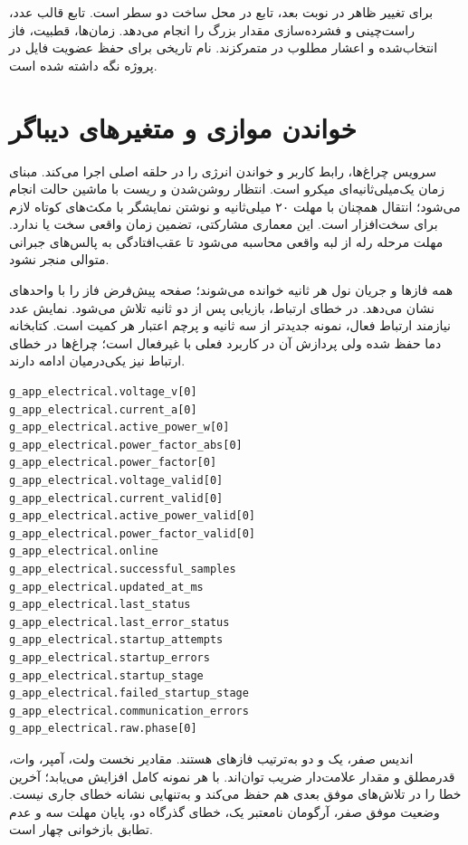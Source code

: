 برای تغییر ظاهر در نوبت بعد، تابع  در
محل ساخت دو سطر است. تابع  قالب عدد، راست‌چینی و فشرده‌سازی مقدار بزرگ را انجام می‌دهد. زمان‌ها، قطبیت، فاز انتخاب‌شده و اعشار مطلوب در
متمرکزند. نام تاریخی  برای حفظ عضویت فایل در پروژه  نگه داشته شده است.

\section{خواندن موازی و متغیرهای دیباگر}
 سرویس چراغ‌ها، رابط کاربر و خواندن انرژی را در حلقه اصلی اجرا می‌کند. مبنای زمان  یک‌میلی‌ثانیه‌ای میکرو است. انتظار روشن‌شدن و ریست  با ماشین حالت انجام می‌شود؛ انتقال  همچنان  با مهلت ۲۰ میلی‌ثانیه و نوشتن نمایشگر با مکث‌های کوتاه لازم برای سخت‌افزار است. این معماری مشارکتی، تضمین زمان واقعی سخت یا  ندارد. مهلت مرحله رله از لبه واقعی محاسبه می‌شود تا عقب‌افتادگی به پالس‌های جبرانی متوالی منجر نشود.

همه فازها و جریان نول هر ثانیه خوانده می‌شوند؛ صفحه پیش‌فرض فاز  را با واحدهای  نشان می‌دهد. در خطای ارتباط، بازیابی پس از دو ثانیه تلاش می‌شود. نمایش عدد نیازمند ارتباط فعال، نمونه جدیدتر از سه ثانیه و پرچم اعتبار هر کمیت است. کتابخانه دما حفظ شده ولی پردازش آن در کاربرد فعلی با  غیرفعال است؛ چراغ‌ها در خطای ارتباط نیز یکی‌درمیان ادامه دارند.

\begin{latin}
\begin{lstlisting}
g_app_electrical.voltage_v[0]
g_app_electrical.current_a[0]
g_app_electrical.active_power_w[0]
g_app_electrical.power_factor_abs[0]
g_app_electrical.power_factor[0]
g_app_electrical.voltage_valid[0]
g_app_electrical.current_valid[0]
g_app_electrical.active_power_valid[0]
g_app_electrical.power_factor_valid[0]
g_app_electrical.online
g_app_electrical.successful_samples
g_app_electrical.updated_at_ms
g_app_electrical.last_status
g_app_electrical.last_error_status
g_app_electrical.startup_attempts
g_app_electrical.startup_errors
g_app_electrical.startup_stage
g_app_electrical.failed_startup_stage
g_app_electrical.communication_errors
g_app_electrical.raw.phase[0]
\end{lstlisting}
\end{latin}

اندیس صفر، یک و دو به‌ترتیب فازهای  هستند. مقادیر نخست ولت، آمپر، وات، قدرمطلق و مقدار علامت‌دار ضریب توان‌اند.  با هر نمونه کامل افزایش می‌یابد؛  آخرین خطا را در تلاش‌های موفق بعدی هم حفظ می‌کند و به‌تنهایی نشانه خطای جاری نیست. وضعیت موفق صفر، آرگومان نامعتبر یک، خطای گذرگاه دو، پایان مهلت سه و عدم تطابق بازخوانی چهار است.


